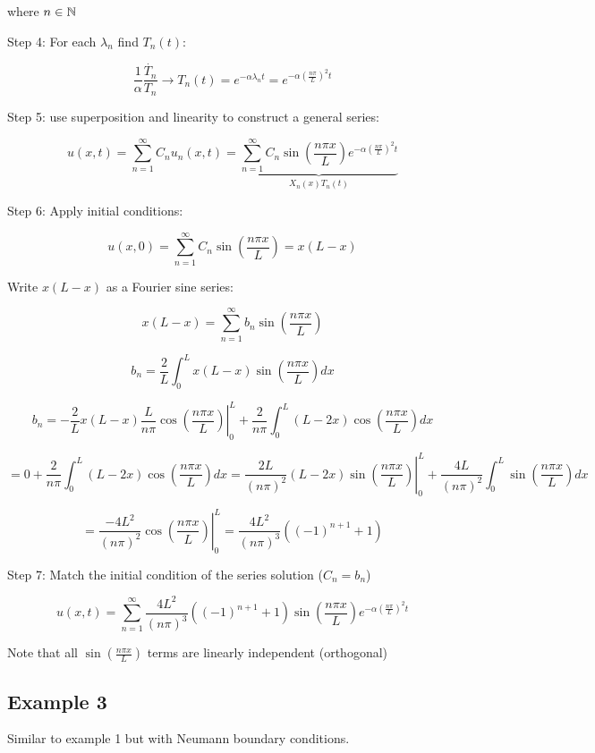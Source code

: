 \documentclass{article}
\begin{document}
where $n \in \mathbb{N}$

Step 4: For each $\lambda_n$ find $T_n(t)$:

$$\frac{1}{\alpha} \frac{\dot{T_n}}{T_n} \rightarrow T_n(t) = e^{- \alpha \lambda_n t} = e^{- \alpha \left( \frac{n \pi}{L} \right)^2 t}$$

Step 5: use superposition and linearity to construct a general series:

$$u(x,t) = \sum_{n  =1}^\infty C_n u_n (x,t) = \underbrace{\sum_{n = 1}^\infty C_n \sin \left( \frac{n \pi x}{L} \right) e^{- \alpha \left( \frac{n \pi}{L} \right)^2 t}}_{X_n(x) T_n(t)}$$

Step 6: Apply initial conditions:

$$u(x,0) = \sum_{n = 1}^\infty C_n \sin (\frac{n \pi x}{L} ) = x(L-x)$$


Write $x(L-x)$ as a Fourier sine series: 

$$x(L-x) = \sum_{n = 1}^\infty b_n \sin (\frac{n \pi x}{L} )$$

$$b_n = \frac{2}{L} \int_0^L x(L-x) \sin \left( \frac{n \pi x}{L} \right) dx$$

$$b_n = \left. - \frac{2}{L} x(L-x) \frac{L}{n \pi} \cos(\frac{n \pi x}{L}) \right|_{0}^{L} + \frac{2}{n \pi} \int_{0}^L (L - 2x) \cos(\frac{n \pi x}{L}) dx$$

$$ = 0 + \frac{2}{n \pi} \int_0^L (L - 2x) \cos \left(\frac{n \pi x}{L} \right) dx = \left. \frac{2L}{(n \pi)^2} (L - 2x) \sin \left(\frac{n \pi x}{L} \right) \right|_{0}^L + \frac{4L}{(n \pi)^2} \int_0^L \sin \left(\frac{n \pi x}{L} \right) dx$$

$$ = \left. \frac{- 4 L^2}{(n \pi)^2} \cos \left(\frac{n \pi x}{L} \right) \right|_0^L = \frac{4L^2}{(n \pi)^3} \left( (-1)^{n+1} + 1 \right)$$

Step 7: Match the initial condition of the series solution ($C_n = b_n$)

$$u(x,t) = \sum_{n = 1}^\infty \frac{4 L^2}{(n \pi)^3} \left( (-1)^{n+1} + 1 \right) \sin \left( \frac{n \pi x}{L} \right) e^{- \alpha \left( \frac{n \pi}{L} \right)^2 t}$$

Note that all $\sin(\frac{n \pi x}{L})$ terms are linearly independent (orthogonal)

\subsection{Example 3}

Similar to example 1 but with Neumann boundary conditions.
\end{document}
